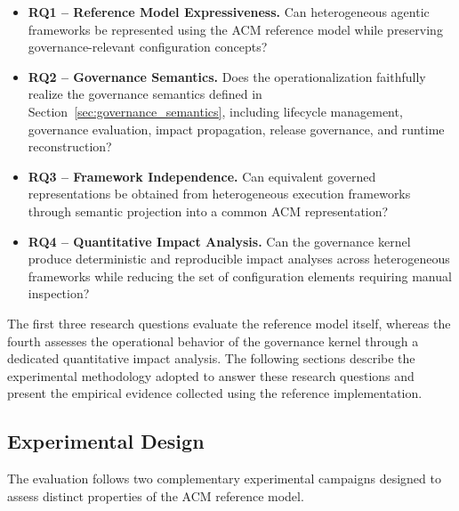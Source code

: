 \documentclass[10pt]{article}
\begin{document}
\begin{itemize}
	
	\item \textbf{RQ1 -- Reference Model Expressiveness.}
	Can heterogeneous agentic frameworks be represented using the ACM reference model while preserving governance-relevant configuration concepts?
	
	\item \textbf{RQ2 -- Governance Semantics.}
	Does the operationalization faithfully realize the governance semantics defined in Section~\ref{sec:governance_semantics}, including lifecycle management, governance evaluation, impact propagation, release governance, and runtime reconstruction?
	
	\item \textbf{RQ3 -- Framework Independence.}
	Can equivalent governed representations be obtained from heterogeneous execution frameworks through semantic projection into a common ACM representation?
	
	\item \textbf{RQ4 -- Quantitative Impact Analysis.}
	Can the governance kernel produce deterministic and reproducible impact analyses across heterogeneous frameworks while reducing the set of configuration elements requiring manual inspection?
	
\end{itemize}

The first three research questions evaluate the reference model itself, whereas the fourth assesses the operational behavior of the governance kernel through a dedicated quantitative impact analysis.
The following sections describe the experimental methodology adopted to answer these research questions and present the empirical evidence collected using the reference implementation.


\subsection{Experimental Design}
\label{sec:experimental_protocol}

The evaluation follows two complementary experimental campaigns designed to assess distinct properties of the ACM reference model.
\end{document}
